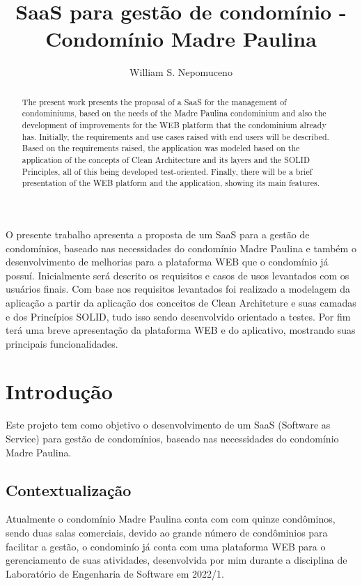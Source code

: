 \documentclass[12pt]{article}
\title{SaaS para gestão de condomínio - Condomínio Madre Paulina}
\author{William S. Nepomuceno\inst{1}}
\begin{document}
\maketitle

\begin{abstract}
The present work presents the proposal of a SaaS for the management of condominiums, based on the needs of the Madre Paulina condominium and also the development of improvements for the WEB platform that the condominium already has. Initially, the requirements and use cases raised with end users will be described. Based on the requirements raised, the application was modeled based on the application of the concepts of Clean Architecture and its layers and the SOLID Principles, all of this being developed test-oriented. Finally, there will be a brief presentation of the WEB platform and the application, showing its main features.
\end{abstract}

\begin{resumo} 
O presente trabalho apresenta a proposta de um SaaS para a gestão de condomínios, baseado nas necessidades do condomínio Madre Paulina e também o desenvolvimento de melhorias para a plataforma WEB que o condomínio já possuí. Inicialmente será descrito os requisitos e casos de usos levantados com os usuários finais. Com base nos requisitos levantados foi realizado a modelagem da aplicação a partir da aplicação dos conceitos de Clean Architeture e suas camadas e dos Princípios SOLID, tudo isso sendo desenvolvido orientado a testes. Por fim terá uma breve apresentação da plataforma WEB e do aplicativo, mostrando suas principais funcionalidades.

\end{resumo}

\section{Introdução}
Este projeto tem como objetivo o desenvolvimento de um SaaS (Software as Service) para gestão de condomínios, baseado nas necessidades do condomínio Madre Paulina.

\subsection{Contextualização}
Atualmente o condomínio Madre Paulina conta com com quinze condôminos, sendo duas salas comerciais, devido ao grande número de condôminios para facilitar a gestão,
o condominío já conta com uma plataforma WEB para o gerenciamento de suas atividades, desenvolvida por mim durante a disciplina de Laboratório de Engenharia de Software em 2022/1.
\end{document}
